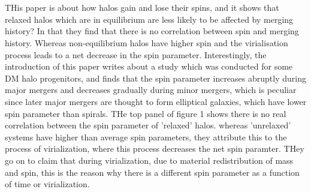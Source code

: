 \documentclass[fleqn,usenatbib]{mnras}
\begin{document}
\section{\citet{Donghia_08}}
THis paper is about how halos gain and lose their spins, and it shows that relaxed halos which are in equilibrium are less likely to be affected by merging history? In that they find that there is no correlation between spin and merging history. Whereas non-equilibrium halos have higher spin and the virialisation process leads to a net decrease in the spin parameter. Interestingly, the introduction of this paper writes about a study\citep{Vitvitska_02} which was conducted for some DM halo progenitors, and finds that the spin parameter increases abruptly during major mergers and decreases gradually during minor mergers, which is peculiar since later major mergers are thought to form elliptical galaxies, which have lower spin parameter than spirals. 
THe top panel of figure 1 shows there is no real correlation between the spin parameter of 'relaxed' halos. whereas 'unrelaxed' systems have higher than average spin parameters, they attribute this to the process of virialization, where this process decreases the net spin paramter. THey go on to claim that during virialization, due to material redistribution of mass and spin, this is the reason why there is a different spin parameter as a function of time or virialization. 

\section{\citet{Trowland_13}}
\end{document}
